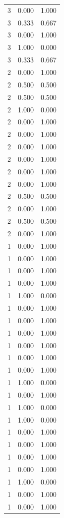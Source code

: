 \begin{tabular}{rrr}
3 & 0.000 & 1.000 \\
3 & 0.333 & 0.667 \\
3 & 0.000 & 1.000 \\
3 & 1.000 & 0.000 \\
3 & 0.333 & 0.667 \\
2 & 0.000 & 1.000 \\
2 & 0.500 & 0.500 \\
2 & 0.500 & 0.500 \\
2 & 1.000 & 0.000 \\
2 & 0.000 & 1.000 \\
2 & 0.000 & 1.000 \\
2 & 0.000 & 1.000 \\
2 & 0.000 & 1.000 \\
2 & 0.000 & 1.000 \\
2 & 0.000 & 1.000 \\
2 & 0.500 & 0.500 \\
2 & 0.000 & 1.000 \\
2 & 0.500 & 0.500 \\
2 & 0.000 & 1.000 \\
1 & 0.000 & 1.000 \\
1 & 0.000 & 1.000 \\
1 & 0.000 & 1.000 \\
1 & 0.000 & 1.000 \\
1 & 1.000 & 0.000 \\
1 & 0.000 & 1.000 \\
1 & 0.000 & 1.000 \\
1 & 0.000 & 1.000 \\
1 & 0.000 & 1.000 \\
1 & 0.000 & 1.000 \\
1 & 0.000 & 1.000 \\
1 & 1.000 & 0.000 \\
1 & 0.000 & 1.000 \\
1 & 1.000 & 0.000 \\
1 & 1.000 & 0.000 \\
1 & 0.000 & 1.000 \\
1 & 0.000 & 1.000 \\
1 & 0.000 & 1.000 \\
1 & 0.000 & 1.000 \\
1 & 1.000 & 0.000 \\
1 & 0.000 & 1.000 \\
1 & 0.000 & 1.000 \\
\bottomrule
\end{tabular}
